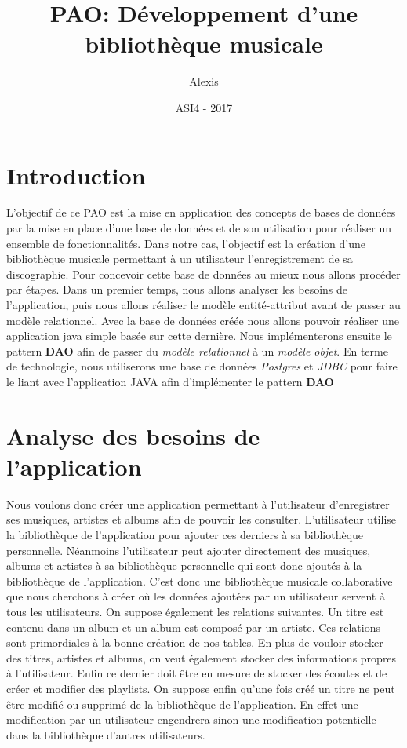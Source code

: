 \documentclass[a4paper,12pt, french]{report}
\title{PAO: Développement d'une bibliothèque musicale}
\author{Alexis \bsc{Durieux}}
\date{ASI4 - 2017}
\begin{document}
\maketitle
\tableofcontents

\chapter*{Introduction}
L'objectif de ce PAO est la mise en application des concepts de bases de données par la mise en place d'une base de données et de son utilisation pour réaliser un ensemble de fonctionnalités. Dans notre cas, l'objectif est la création d'une bibliothèque musicale permettant à un utilisateur l'enregistrement de sa discographie. Pour concevoir cette base de données au mieux nous allons procéder par étapes. Dans un premier temps, nous allons analyser les besoins de l'application, puis nous allons réaliser le modèle entité-attribut avant de passer au modèle relationnel. Avec la base de données créée nous allons pouvoir réaliser une application java simple basée sur cette dernière. Nous implémenterons ensuite le pattern \textbf{DAO} afin de passer du \emph{modèle relationnel} à un \emph{modèle objet}. En terme de technologie, nous utiliserons une base de données \emph{Postgres} et \emph{JDBC} pour faire le liant avec l'application JAVA afin d'implémenter le pattern \textbf{DAO}

\chapter{Analyse des besoins de l'application}
Nous voulons donc créer une application permettant à l'utilisateur d'enregistrer ses musiques, artistes et albums afin de pouvoir les consulter. L'utilisateur utilise la bibliothèque de l'application pour ajouter ces derniers à sa  bibliothèque personnelle. Néanmoins l'utilisateur peut ajouter directement des musiques, albums et artistes à sa bibliothèque personnelle qui sont donc ajoutés à la bibliothèque de l'application. C'est donc une bibliothèque musicale collaborative que nous cherchons à créer où les données ajoutées par un utilisateur servent à tous les utilisateurs. On suppose également les relations suivantes. Un titre est contenu dans un album et un album est composé par un artiste. Ces relations sont primordiales à la bonne création de nos tables. En plus de vouloir stocker des titres, artistes et albums, on veut également stocker des informations propres à l'utilisateur. Enfin ce dernier doit être en mesure de stocker des écoutes et de créer et modifier des playlists. On suppose enfin qu'une fois créé un titre ne peut être modifié ou supprimé de la bibliothèque de l'application. En effet une modification par un utilisateur engendrera sinon une modification potentielle dans la bibliothèque d'autres utilisateurs.
\end{document}

